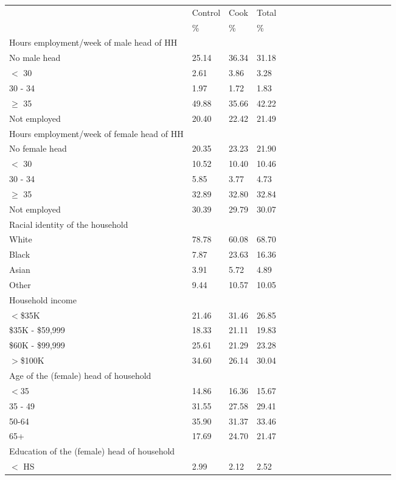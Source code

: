 \begin{center}
\footnotesize
{}
\begin{tabularx} {14cm} {@{} l Y Y Y Y Y Y Y Y Y Y Y Y Y Y Y Y@{}} \\
\toprule
 
&Control&Cook&Total \\
\cmidrule(l{.75em}){2-2} \cmidrule(l{.75em}){3-3}\cmidrule(l{.75em}){4-4}
&\%&\%&\% \\
\midrule
Hours employment/week of male head of HH&&& \\
No male head&25.14&36.34&31.18 \\
$<$ 30&2.61&3.86&3.28 \\
30 - 34&1.97&1.72&1.83 \\
$\geq$ 35&49.88&35.66&42.22 \\
Not employed&20.40&22.42&21.49 \\
\midrule
Hours employment/week of female head of HH&&& \\
No female head&20.35&23.23&21.90 \\
$<$ 30&10.52&10.40&10.46 \\
30 - 34&5.85&3.77&4.73 \\
$\geq$ 35&32.89&32.80&32.84 \\
Not employed&30.39&29.79&30.07 \\
\midrule
Racial identity of the household&&& \\
White&78.78&60.08&68.70 \\
Black&7.87&23.63&16.36 \\
Asian&3.91&5.72&4.89 \\
Other&9.44&10.57&10.05 \\
\midrule
Household income&&& \\
$<$\$35K&21.46&31.46&26.85 \\
\$35K - \$59,999&18.33&21.11&19.83 \\
\$60K - \$99,999&25.61&21.29&23.28 \\
$>$\$100K&34.60&26.14&30.04 \\
\midrule
Age of the (female) head of household&&& \\
$<$35&14.86&16.36&15.67 \\
35 - 49&31.55&27.58&29.41 \\
50-64&35.90&31.37&33.46 \\
65+&17.69&24.70&21.47 \\
\midrule
Education of the (female) head of household&&& \\
$<$ HS&2.99&2.12&2.52 \\

\end{tabularx}
\end{center}
